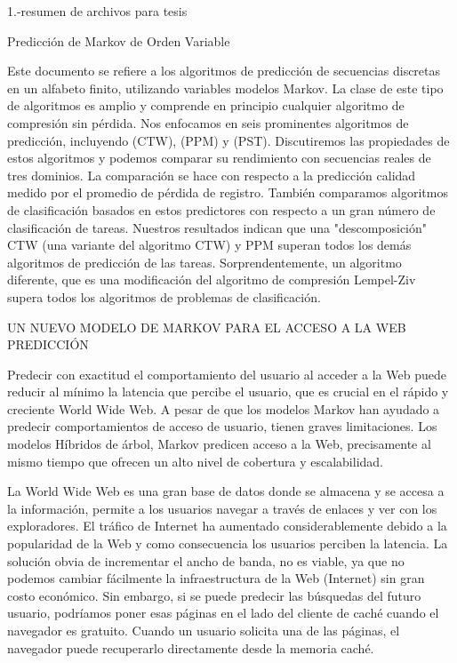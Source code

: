 1.-resumen de archivos para tesis

Predicción de Markov de Orden Variable

Este documento se refiere a los algoritmos de predicción de secuencias discretas en un alfabeto finito, utilizando variables modelos Markov. La clase de este tipo de algoritmos es amplio y comprende en principio cualquier algoritmo de compresión sin pérdida. Nos enfocamos en seis prominentes algoritmos de predicción, incluyendo  (CTW), (PPM) y (PST).  Discutiremos las propiedades de estos algoritmos y podemos comparar su rendimiento con secuencias reales de tres dominios.
La comparación se hace con respecto a la predicción calidad medido por el promedio de pérdida de registro. También comparamos algoritmos de clasificación basados en estos predictores con respecto a un gran número de clasificación de  tareas. Nuestros resultados indican que una "descomposición" CTW (una variante del algoritmo CTW) y PPM superan todos los demás algoritmos de predicción de las tareas. Sorprendentemente, un algoritmo diferente, que es una modificación del algoritmo de compresión Lempel-Ziv supera todos los algoritmos de  problemas de clasificación.

UN NUEVO MODELO DE MARKOV PARA EL ACCESO A LA WEB PREDICCIÓN

Predecir con exactitud el comportamiento del usuario al acceder a la Web puede reducir al mínimo la latencia que percibe el usuario, que es crucial en el rápido y creciente World Wide Web. A pesar de que los modelos Markov han ayudado a predecir comportamientos de acceso de usuario, tienen graves limitaciones. Los modelos Híbridos de árbol, Markov predicen acceso a la Web, precisamente al mismo tiempo que ofrecen un alto nivel de cobertura y escalabilidad.

La World Wide Web es una gran base de datos donde se almacena  y se accesa a la información, permite a los usuarios navegar a través de enlaces y ver con los exploradores. El tráfico de Internet ha aumentado considerablemente debido a la popularidad de la Web y como consecuencia los usuarios perciben la latencia. La solución obvia de incrementar el ancho de banda, no es viable, ya que no podemos cambiar fácilmente la infraestructura de la Web (Internet) sin gran costo económico. Sin embargo, si se puede predecir las búsquedas del futuro usuario, podríamos poner esas páginas en el lado del cliente de caché cuando el navegador es gratuito. Cuando un usuario solicita una de las páginas, el navegador puede recuperarlo directamente desde la memoria caché.

